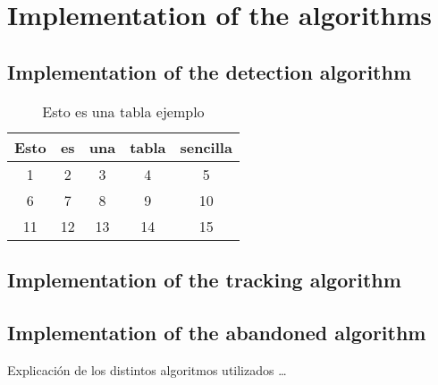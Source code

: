 
\chapter{Implementation of the algorithms}
\label{cha:algorithms}

\section{Implementation of the detection algorithm}
\label{sec:alg-detection}


\begin{table}[!h]
\centering
\begin{tabular}{|c|c|c|c|c|}
\hline
Esto & es & una & tabla & sencilla \\ \hline
1    & 2  & 3   & 4     & 5        \\ \hline
6    & 7  & 8   & 9     & 10       \\ \hline
11   & 12 & 13  & 14    & 15       \\ \hline
\end{tabular}
\caption{Esto es una tabla ejemplo}
\label{tab:my-table}
\end{table}



\section{Implementation of the tracking algorithm}
\label{sec:alg-tracking}


\section{Implementation of the abandoned algorithm}
\label{sec:alg-abandoned}

Explicación de los distintos algoritmos utilizados \ldots